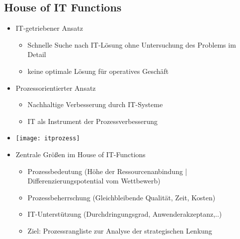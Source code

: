 \subsection{House of IT Functions}
\begin{itemize}
\item IT-getriebener Ansatz
	\begin{itemize}
	\item Schnelle Suche nach IT-Lösung ohne Untersuchung des Problems im Detail
	\item keine optimale Lösung für operatives Geschäft
	\end{itemize}
	
\item Prozessorientierter Ansatz
	\begin{itemize}
	\item Nachhaltige Verbesserung durch IT-Systeme
	\item IT als Instrument der Prozessverbesserung
	\end{itemize}
	
\item[] \texttt{[image: itprozess]}

\item Zentrale Größen im House of IT-Functions
	\begin{itemize}
	\item Prozessbedeutung (Höhe der Ressourcenanbindung | Differenzierungspotential vom Wettbewerb)
	\item Prozessbeherrschung (Gleichbleibende Qualität, Zeit, Kosten)
	\item IT-Unterstützung (Durchdringungsgrad, Anwenderakzeptanz,..)
	\item Ziel: Prozessrangliste zur Analyse der strategischen Lenkung
	\end{itemize}


\end{itemize}
